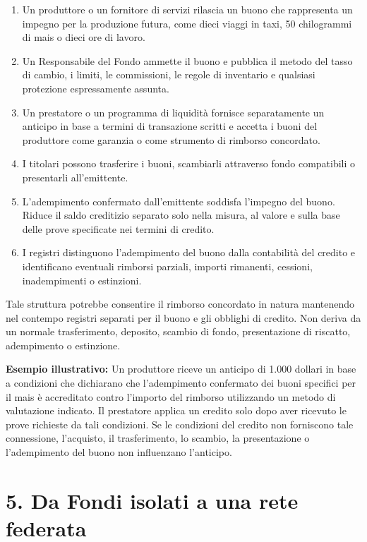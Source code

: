 \documentclass[11pt]{article}
\begin{document}
\begin{enumerate}[leftmargin=*]
\item Un produttore o un fornitore di servizi rilascia un buono che rappresenta un impegno per la produzione futura, come dieci viaggi in taxi, 50 chilogrammi di mais o dieci ore di lavoro.
\item Un Responsabile del Fondo ammette il buono e pubblica il metodo del tasso di cambio, i limiti, le commissioni, le regole di inventario e qualsiasi protezione espressamente assunta.
\item Un prestatore o un programma di liquidità fornisce separatamente un anticipo in base a termini di transazione scritti e accetta i buoni del produttore come garanzia o come strumento di rimborso concordato.
\item I titolari possono trasferire i buoni, scambiarli attraverso fondo compatibili o presentarli all'emittente.
\item L'adempimento confermato dall'emittente soddisfa l'impegno del buono. Riduce il saldo creditizio separato solo nella misura, al valore e sulla base delle prove specificate nei termini di credito.
\item I registri distinguono l'adempimento del buono dalla contabilità del credito e identificano eventuali rimborsi parziali, importi rimanenti, cessioni, inadempimenti o estinzioni.
\end{enumerate}
Tale struttura potrebbe consentire il rimborso concordato in natura mantenendo nel contempo registri separati per il buono e gli obblighi di credito. Non deriva da un normale trasferimento, deposito, scambio di fondo, presentazione di riscatto, adempimento o estinzione.

\textbf{Esempio illustrativo:} Un produttore riceve un anticipo di 1.000 dollari in base a condizioni che dichiarano che l'adempimento confermato dei buoni specifici per il mais è accreditato contro l'importo del rimborso utilizzando un metodo di valutazione indicato. Il prestatore applica un credito solo dopo aver ricevuto le prove richieste da tali condizioni. Se le condizioni del credito non forniscono tale connessione, l'acquisto, il trasferimento, lo scambio, la presentazione o l'adempimento del buono non influenzano l'anticipo.


\section*{5. Da Fondi isolati a una rete federata}
\end{document}
